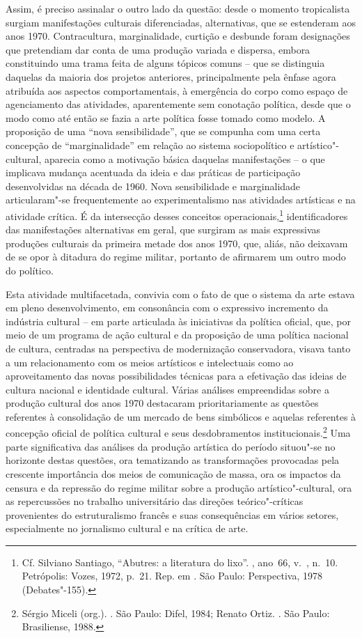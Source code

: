 Assim, é preciso assinalar o outro lado da questão: desde o momento
tropicalista surgiam manifestações culturais diferenciadas,
alternativas, que se estenderam aos anos 1970. Contracultura,
marginalidade, curtição e desbunde foram designações que pretendiam dar
conta de uma produção variada e dispersa, embora constituindo uma trama
feita de alguns tópicos comuns -- que se distinguia daquelas da maioria
dos projetos anteriores, principalmente pela ênfase agora atribuída aos
aspectos comportamentais, à emergência do corpo como espaço de
agenciamento das atividades, aparentemente sem conotação política, desde
que o modo como até então se fazia a arte política fosse tomado como
modelo. A proposição de uma ``nova sensibilidade'', que se compunha com
uma certa concepção de ``marginalidade'' em relação ao sistema
sociopolítico e artístico"-cultural, aparecia como a motivação básica
daquelas manifestações -- o que implicava mudança acentuada da ideia e
das práticas de participação desenvolvidas na década de 1960. Nova
sensibilidade e marginalidade articularam"-se frequentemente ao
experimentalismo nas atividades artísticas e na atividade crítica. É da
intersecção desses conceitos operacionais,\footnote{Cf. Silviano
  Santiago, ``Abutres: a literatura do lixo''. {},
  ano~66, v.~\scalebox{0.8}{LXVI}, n.~10. Petrópolis: Vozes, 1972, p.~21. Rep. em
  {}. São Paulo: Perspectiva, 1978
  (Debates"-155).} identificadores das manifestações alternativas em
geral, que surgiram as mais expressivas produções culturais da primeira
metade dos anos 1970, que, aliás, não deixavam de se opor à ditadura do
regime militar, portanto de afirmarem um outro modo do político.

Esta atividade multifacetada, convivia com o fato de que o sistema da
arte estava em pleno desenvolvimento, em consonância com o expressivo
incremento da indústria cultural -- em parte articulada às iniciativas
da política oficial, que, por meio de um programa de ação cultural e da
proposição de uma política nacional de cultura, centradas na perspectiva
de modernização conservadora, visava tanto a um relacionamento com os
meios artísticos e intelectuais como ao aproveitamento das novas
possibilidades técnicas para a efetivação das ideias de cultura nacional
e identidade cultural. Várias análises empreendidas sobre a produção
cultural dos anos 1970 destacaram prioritariamente as questões
referentes à consolidação de um mercado de bens simbólicos e aquelas
referentes à concepção oficial de política cultural e seus
desdobramentos institucionais.\footnote{Sérgio Miceli (org.).
  {}. São Paulo: Difel, 1984; Renato
  Ortiz. {}. São Paulo: Brasiliense,
  1988.} Uma parte significativa das análises da produção artística do
período situou"-se no horizonte destas questões, ora tematizando as
transformações provocadas pela crescente importância dos meios de
comunicação de massa, ora os impactos da censura e da repressão do
regime militar sobre a produção artístico"-cultural, ora as repercussões
no trabalho universitário das direções teórico"-críticas provenientes do
estruturalismo francês e suas consequências em vários setores,
especialmente no jornalismo cultural e na crítica de arte.


